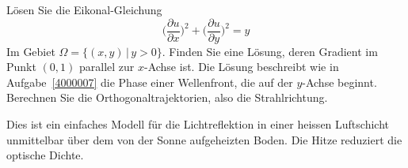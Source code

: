 Lösen Sie die Eikonal-Gleichung
\begin{equation}
\biggl( \frac{\partial u}{\partial x} \biggr)^2
+
\biggl( \frac{\partial u}{\partial y} \biggr)^2
=
y
\label{4000008:eikonal}
\end{equation}
Im Gebiet $\Omega=\{(x,y)\,|\, y > 0\}$.
Finden Sie eine Lösung, deren Gradient im Punkt $(0,1)$ parallel
zur $x$-Achse ist.
Die Lösung beschreibt wie in Aufgabe~\ref{4000007} die
Phase einer Wellenfront, die auf der $y$-Achse beginnt.
Berechnen Sie die Orthogonaltrajektorien, also die Strahlrichtung.

\begin{hinweis}
Dies ist ein einfaches Modell für die Lichtreflektion in einer
heissen Luftschicht unmittelbar über dem von der Sonne aufgeheizten
Boden. Die Hitze reduziert die optische Dichte.
\end{hinweis}

